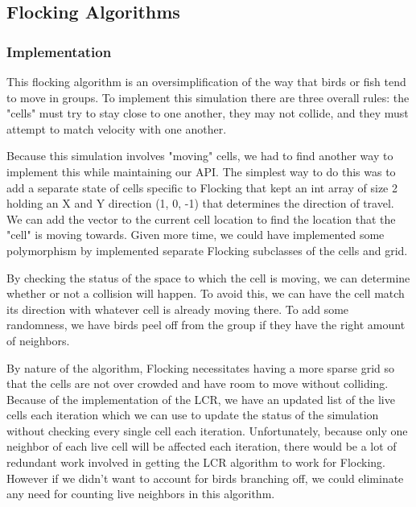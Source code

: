 \documentclass[12pt]{article}
\begin{document}
\subsection{Flocking Algorithms}
\subsubsection{Implementation}
\par This flocking algorithm is an oversimplification of the way that birds or fish tend to move in groups. To implement this simulation there are three overall rules: the "cells" must try to stay close to one another, they may not collide, and they must attempt to match velocity with one another.
\par Because this simulation involves "moving" cells, we had to find another way to implement this while maintaining our API. The simplest way to do this was to add a separate state of cells specific to Flocking that kept an int array of size 2 holding an X and Y direction (1, 0, -1) that determines the direction of travel. We can add the vector to the current cell location to find the location that the "cell" is moving towards. Given more time, we could have implemented some polymorphism by implemented separate Flocking subclasses of the cells and grid.
\par By checking the status of the space to which the cell is moving, we can determine whether or not a collision will happen. To avoid this, we can have the cell match its direction with whatever cell is already moving there. To add some randomness, we have birds peel off from the group if they have the right amount of neighbors.
\par By nature of the algorithm, Flocking necessitates having a more sparse grid so that the cells are not over crowded and have room to move without colliding. Because of the implementation of the LCR, we have an updated list of the live cells each iteration which we can use to update the status of the simulation without checking every single cell each iteration. Unfortunately, because only one neighbor of each live cell will be affected each iteration, there would be a lot of redundant work involved in getting the LCR algorithm to work for Flocking. However if we didn't want to account for birds branching off, we could eliminate any need for counting live neighbors in this algorithm.
\end{document}
